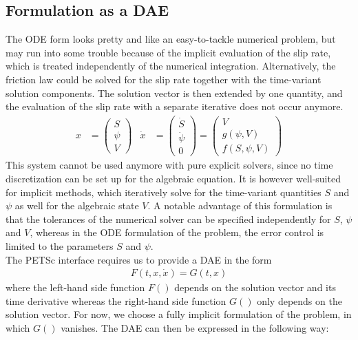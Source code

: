 \subsection{Formulation as a DAE}
The ODE form looks pretty and like an easy-to-tackle numerical problem, but may run into some trouble because of the implicit evaluation of the slip rate, which is treated independently of the numerical integration. Alternatively, the friction law could be solved for the slip rate together with the time-variant solution components. The solution vector is then extended by one quantity, and the evaluation of the slip rate with a separate iterative does not occur anymore.
\begin{align}
	\label{eq:DAE_formulation_SEAS}
	x &= \begin{pmatrix}
			S \\ \psi \\ V
		 \end{pmatrix} & \dot{x} &= \begin{pmatrix}
										\dot{S} \\ \dot{\psi} \\ 0
									\end{pmatrix} = \begin{pmatrix}
										V \\ g(\psi, V) \\ f(S,\psi,V)
									\end{pmatrix}
\end{align}
This system cannot be used anymore with pure explicit solvers, since no time discretization can be set up for the algebraic equation. It is however well-suited for implicit methods, which iteratively solve for the time-variant quantities $S$ and $\psi$ as well for the algebraic state $V$. A notable advantage of this formulation is that the tolerances of the numerical solver can be specified independently for $S$, $\psi$ and $V$, whereas in the ODE formulation of the problem, the error control is limited to the parameters $S$ and $\psi$. \\
The PETSc interface requires us to provide a DAE in the form
\begin{align}
	F(t, x,\dot{x}) = G(t,x) 
\end{align}
where the left-hand side function $F()$ depends on the solution vector and its time derivative whereas the right-hand side function $G()$ only depends on the solution vector. For now, we choose a fully implicit formulation of the problem, in which $G()$ vanishes. The DAE can then be expressed in the following way: 
